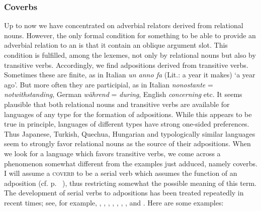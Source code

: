 \subsubsection{Coverbs}\label{sec:3.4.1.7}
Up to now we have concentrated on adverbial relators derived from relational nouns. However, the only formal condition for something to be able to provide an adverbial relation to an \np is that it contain an oblique argument slot. This condition is fulfilled, among the lexemes, not only by relational nouns but also by transitive verbs. Accordingly, we find adpositions derived from transitive verbs. Sometimes these are finite, as in Italian \textit{un anno fa} (Lit.: a year it makes) ‘a year ago’. But more often they are participial, as in Italian \textit{nonostante} = \textit{notwithstanding}, German \textit{während} = \textit{during}, English \textit{concerning} etc. It seems plausible that both relational nouns and transitive verbs are available for languages of any type for the formation of adpositions. While this appears to be true in principle, languages of different types have strong one-sided preferences. Thus Japanese, Turkish, Quechua, Hungarian and typologically similar languages seem to strongly favor relational nouns as the source of their adpositions. When we look for a language which favors transitive verbs, we come across a phenomenon somewhat different from the examples just adduced, namely coverbs. I will assume a \textsc{coverb} to be a serial verb which assumes the function of an adposition (cf. p.~\pageref{page37}\chk%
), thus restricting somewhat the possible meaning of this term. The development of serial verbs to adpositions has been treated repeatedly in recent times; see, for example, \citet{LiEtAL1974}, \citet{Hagège1975}, \citet[esp. p.~93ff]{Givón1975}, \citet{Hyman1975}, \citet[33--40]{Kahr1975}, \citet[113--117]{Sasse1977a}, \citet{Huang1978}, \citet{Clark1979} and \citet[213--228]{Lightfoot1979}. Here are some examples:


